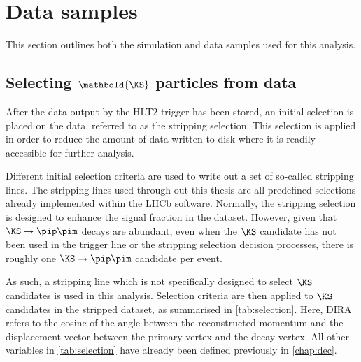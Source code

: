 \newpage



\section{Data samples}
\label{sec:datasamples}
This section outlines both the simulation and data samples used for this analysis.
\subsection[{Selecting $K^{0}_{s}$ particles from data}]{Selecting $\mathbold{\KS}$ particles from data}

After the data output by the HLT2 trigger has been stored, an initial selection is placed on the data, referred to as the stripping selection. This selection is applied in order to reduce the amount of data written to disk where it is readily accessible for further analysis. %

Different initial selection criteria are used to write out a set of so-called stripping lines. The stripping lines used through out this thesis are all predefined selections already implemented within the LHCb software. Normally, the stripping selection is designed to enhance the signal fraction in the dataset. However, given that $\KS \to \pip\pim$ decays are abundant, even when the $\KS$ candidate has not been used in the trigger line or the stripping selection decision processes, there is roughly one $\KS\to\pip\pim$ candidate per event.

As such, a stripping line which is not specifically designed to select $\KS$ candidates is used in this analysis. Selection criteria are then applied to $\KS$ candidates in the stripped dataset, as summarised in \autoref{tab:selection}. Here, \Gls{DIRA} refers to the cosine of the angle between the reconstructed \KS momentum and the displacement vector between the primary vertex and the \KS decay vertex. All other variables in \autoref{tab:selection} have already been defined previously in \autoref{chap:dec}.

